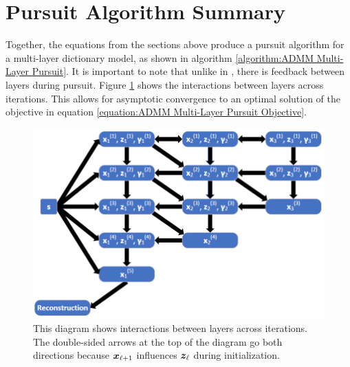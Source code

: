 \section{Pursuit Algorithm Summary}
Together, the equations from the sections above produce a pursuit algorithm for a multi-layer dictionary model, as shown in algorithm \ref{algorithm:ADMM Multi-Layer Pursuit}. It is important to note that unlike in \cite{zeiler2010deconvolutional}, there is feedback between layers during pursuit.  Figure \ref{figure:ADMM Multi-Layer Pursuit Diagram} shows the interactions between layers across iterations. This allows for asymptotic convergence to an optimal solution of the objective in equation \ref{equation:ADMM Multi-Layer Pursuit Objective}.
\begin{figure}
	\includegraphics[width=\textwidth]{figures/multi-layer_ADMM-node-dependencies.PNG}
	\caption{This diagram shows interactions between layers across iterations. The double-sided arrows at the top of the diagram go both directions because $\bm{x}_{\ell + 1}$ influences $\bm{z}_{\ell}$ during initialization.}
	\label{figure:ADMM Multi-Layer Pursuit Diagram}
\end{figure}

